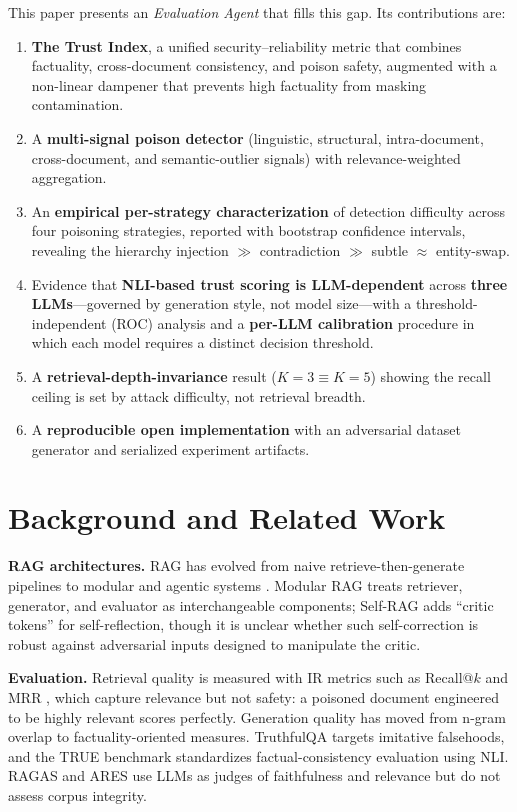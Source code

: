 \documentclass[conference]{IEEEtran}
\begin{document}
This paper presents an \emph{Evaluation Agent} that fills this gap. Its
contributions are:
\begin{enumerate}
  \item \textbf{The Trust Index}, a unified security--reliability metric that
  combines factuality, cross-document consistency, and poison safety, augmented
  with a non-linear dampener that prevents high factuality from masking
  contamination.
  \item A \textbf{multi-signal poison detector} (linguistic, structural,
  intra-document, cross-document, and semantic-outlier signals) with
  relevance-weighted aggregation.
  \item An \textbf{empirical per-strategy characterization} of detection
  difficulty across four poisoning strategies, reported with bootstrap
  confidence intervals, revealing the hierarchy injection $\gg$ contradiction
  $\gg$ subtle $\approx$ entity-swap.
  \item Evidence that \textbf{NLI-based trust scoring is LLM-dependent} across
  \textbf{three LLMs}---governed by generation style, not model size---with a
  threshold-independent (ROC) analysis and a \textbf{per-LLM calibration}
  procedure in which each model requires a distinct decision threshold.
  \item A \textbf{retrieval-depth-invariance} result ($K{=}3 \equiv K{=}5$)
  showing the recall ceiling is set by attack difficulty, not retrieval breadth.
  \item A \textbf{reproducible open implementation} with an adversarial dataset
  generator and serialized experiment artifacts.
\end{enumerate}

\section{Background and Related Work}
\textbf{RAG architectures.} RAG has evolved from naive retrieve-then-generate
pipelines to modular and agentic systems \cite{gao2024retrieval}. Modular RAG
treats retriever, generator, and evaluator as interchangeable components;
Self-RAG \cite{asai2024selfrag} adds ``critic tokens'' for self-reflection,
though it is unclear whether such self-correction is robust against adversarial
inputs designed to manipulate the critic.

\textbf{Evaluation.} Retrieval quality is measured with IR metrics such as
Recall@$k$ and MRR \cite{karpukhin2020dense}, which capture relevance but not
safety: a poisoned document engineered to be highly relevant scores perfectly.
Generation quality has moved from n-gram overlap to factuality-oriented
measures. TruthfulQA \cite{lin2022truthfulqa} targets imitative falsehoods, and
the TRUE benchmark \cite{honovich2022true} standardizes factual-consistency
evaluation using NLI. RAGAS \cite{es2024ragas} and ARES \cite{saadfalcon2024ares}
use LLMs as judges of faithfulness and relevance but do not assess corpus
integrity.
\end{document}
